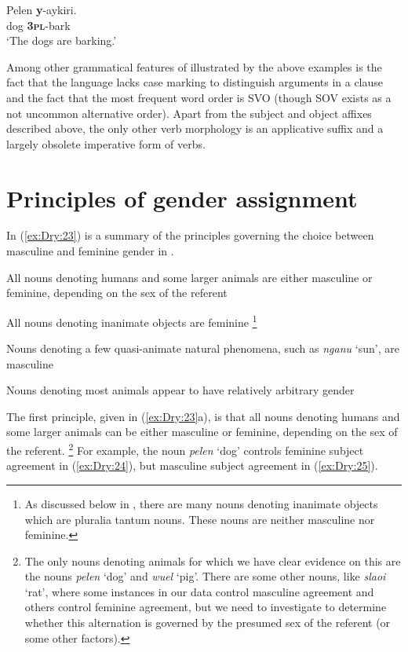 \documentclass[output=collectionpaper]{langsci/langscibook}
\begin{document}
\ea \label{ex:Dry:22}
\gll Pelen	\textbf{y}-aykiri. \\
dog \textbf{\textsc{3pl}}-bark\\
\glt  `The dogs are barking.'
\z

Among other grammatical features of  illustrated by the above examples is the fact that the language lacks case marking to distinguish arguments in a clause and the fact that the most frequent word order is SVO (though SOV exists as a not uncommon alternative order). Apart from the subject and object affixes described above, the only other verb morphology is an applicative suffix and a largely obsolete imperative form of verbs.

\section{Principles of gender assignment}
\label{sec:Dry:3}

In (\ref{ex:Dry:23}) is a summary of the principles governing the choice between masculine and feminine gender in .

\ea%
    \label{ex:Dry:23}
\begin{xlist}
\ex  All nouns denoting humans and some larger animals are either masculine or feminine, depending on the sex of the referent

\ex  All nouns denoting inanimate objects are feminine%
\footnote{As discussed below in , there are many nouns denoting inanimate objects which are pluralia tantum nouns. These nouns are neither masculine nor feminine.}

\ex  Nouns denoting a few quasi-animate natural phenomena, such as \textit{nganu} `sun', are masculine

\ex  Nouns denoting most animals appear to have relatively arbitrary gender
\end{xlist}
\z

The first principle, given in (\ref{ex:Dry:23}a), is that all nouns denoting humans and some larger animals can be either masculine or feminine, depending on the sex of the referent.%
\footnote{The only nouns denoting animals for which we have clear evidence on this are the nouns \textit{pelen} `dog' and \textit{wuel} `pig'. There are some other nouns, like \textit{slaoi} `rat', where some instances in our data control masculine agreement and others control feminine agreement, but we need to investigate to determine whether this alternation is governed by the presumed sex of the referent (or some other factors).} %
For example, the noun \textit{pelen} `dog' controls feminine subject agreement in (\ref{ex:Dry:24}), but masculine subject agreement in (\ref{ex:Dry:25}).
\end{document}
